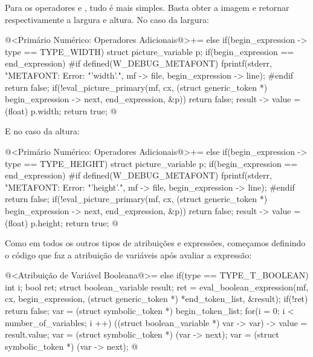 {Para os operadores  e , tudo é
mais simples. Basta obter a imagem e retornar respectivamente a
largura e altura. No caso da largura:

\iniciocodigo
@<Primário Numérico: Operadores Adicionais@>+=
else if(begin_expression -> type == TYPE_WIDTH){
  struct picture_variable p;
  if(begin_expression == end_expression){
#if defined(W_DEBUG_METAFONT)
    fprintf(stderr, "METAFONT: Error: %
                    "'width'.\n", mf -> file, begin_expression -> line);
#endif
    return false;
  }
  if(!eval_picture_primary(mf, cx, (struct generic_token *)
                                   begin_expression -> next, end_expression,
                           &p))
    return false;
  result -> value = (float) p.width;
  return true;
}
@
\fimcodigo

E no caso da altura:

\iniciocodigo
@<Primário Numérico: Operadores Adicionais@>+=
else if(begin_expression -> type == TYPE_HEIGHT){
  struct picture_variable p;
  if(begin_expression == end_expression){
#if defined(W_DEBUG_METAFONT)
    fprintf(stderr, "METAFONT: Error: %
                    "'height'.\n", mf -> file, begin_expression -> line);
#endif
    return false;
  }
  if(!eval_picture_primary(mf, cx, (struct generic_token *)
                                   begin_expression -> next, end_expression,
                           &p))
    return false;
  result -> value = (float) p.height;
  return true;
}
@
\fimcodigo



Como em todos os outros tipos de atribuições e expressões, começamos
definindo o código que faz a atribuição de variáveis após avaliar a
expressão:

\iniciocodigo
@<Atribuição de Variável Booleana@>=
else if(type == TYPE_T_BOOLEAN){
  int i;
  bool ret;
  struct boolean_variable result;
  ret = eval_boolean_expression(mf, cx, begin_expression,
                               (struct generic_token *) *end_token_list,
                                &result);
  if(!ret)
    return false;
  var = (struct symbolic_token *) begin_token_list;
  for(i = 0; i < number_of_variables; i ++){
    ((struct boolean_variable *) var -> var) -> value = result.value;
    var = (struct symbolic_token *) (var -> next);
    var = (struct symbolic_token *) (var -> next);
  }
}
@
\fimcodigo

}
